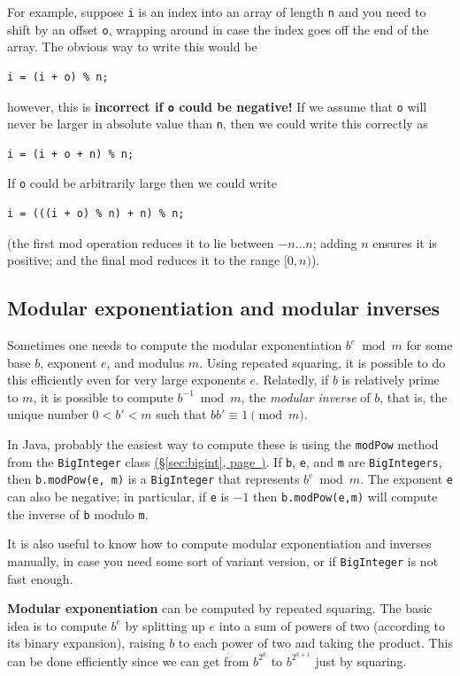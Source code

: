 \documentclass[10pt]{book}
\newcommand*{\link}[1]{\hyperref[{#1}]{(\S\ref*{#1}, page~\pageref*{#1})}}
\begin{document}
For example, suppose \texttt{i} is an index into an array of length
\texttt{n} and you need to shift by an offset \texttt{o}, wrapping
around in case the index goes off the end of the array.  The obvious
way to write this would be
\begin{verbatim}
i = (i + o) % n;
\end{verbatim}
however, this is \textbf{incorrect if \texttt{o} could be negative!}
If we assume that \texttt{o} will never be larger in absolute value
than \texttt{n}, then we could write this correctly as
\begin{verbatim}
i = (i + o + n) % n;
\end{verbatim}
If \texttt{o} could be arbitrarily large then we could write
\begin{verbatim}
i = (((i + o) % n) + n) % n;
\end{verbatim}
(the first mod operation reduces it to lie between $-n \dots n$;
adding $n$ ensures it is positive; and the final mod reduces it to the
range $[0,n)$).

\subsection*{Modular exponentiation and modular inverses}

Sometimes one needs to compute the modular exponentiation
$b^e \bmod m$ for some base $b$, exponent $e$, and modulus $m$.  Using
repeated squaring, it is possible to do this efficiently even for very
large exponents $e$.  Relatedly, if $b$ is relatively prime to $m$, it
is possible to compute $b^{-1} \bmod m$, the \emph{modular inverse} of
$b$, that is, the unique number $0 < b' < m$ such that
$bb' \equiv 1 \pmod m$.

In Java, probably the easiest way to compute these is using the
\texttt{modPow} method from the \texttt{BigInteger} class
\link{sec:bigint}.  If \texttt{b}, \texttt{e}, and \texttt{m} are
\texttt{BigIntegers}, then \texttt{b.modPow(e, m)} is a
\texttt{BigInteger} that represents $b^e \bmod m$.  The exponent
\texttt{e} can also be negative; in particular, if \texttt{e} is $-1$
then \texttt{b.modPow(e,m)} will compute the inverse of
\texttt{b} modulo \texttt{m}.

It is also useful to know how to compute modular exponentiation and
inverses manually, in case you need some sort of variant version, or
if \texttt{BigInteger} is not fast enough.

\textbf{Modular exponentiation} can be computed by repeated squaring.
The basic idea is to compute $b^e$ by splitting up $e$ into a sum of
powers of two (according to its binary expansion), raising $b$ to each
power of two and taking the product.  This can be done efficiently
since we can get from $b^{2^k}$ to $b^{2^{k+1}}$ just by squaring.
\end{document}

